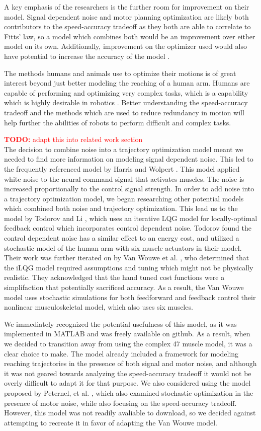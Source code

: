 \documentclass[letterpaper, 10pt, conference]{ieeeconf}
\newcommand{\todo}[1]{\textcolor{red}{\textbf{TODO:} #1}}
\begin{document}
A key emphasis of the researchers is the further room for improvement on their model. Signal dependent noise and motor planning optimization are likely both contributors to the speed-accuracy tradeoff as they both are able to correlate to Fitts’ law, so a model which combines both would be an improvement over either model on its own. Additionally, improvement on the optimizer used would also have potential to increase the accuracy of the model \cite{c4}.

The methods humans and animals use to optimize their motions is of great interest beyond just better modeling the reaching of a human arm. Humans are capable of performing and optimizing very complex tasks, which is a capability which is highly desirable in robotics \cite{c6}. Better understanding the speed-accuracy tradeoff and the methods which are used to reduce redundancy in motion will help further the abilities of robots to perform difficult and complex tasks.

\todo{adapt this into related work section} \\
The decision to combine noise into a trajectory optimization model meant we needed to find more information on modeling signal dependent noise. This led to the frequently referenced model by Harris and Wolpert \cite{c2}. This model applied white noise to the neural command signal that activates muscles. The noise is increased proportionally to the control signal strength. In order to add noise into a trajectory optimization model, we began researching other potential models which combined both noise and trajectory optimization. This lead us to the model by Todorov and Li \cite{c8}, which uses an iterative LQG model for locally-optimal feedback control which incorporates control dependent noise. Todorov found the control dependent noise has a similar effect to an energy cost, and utilized a stochastic model of the human arm with six muscle actuators in their model. Their work was further iterated on by Van Wouwe et al. \cite{c7}, who determined that the iLQG model required assumptions and tuning which might not be physically realistic. They acknowledged that the hand tuned cost functions were a simplifaction that potentially sacrificed accuracy. As a result, the Van Wouwe model uses stochastic simulations for both feedforward and feedback control their nonlinear musculoskeletal model, which also uses six muscles. 

We immediately recognized the potential usefulness of this model, as it was implemented in MATLAB and was freely available on github. As a result, when we decided to transition away from using the complex 47 muscle model, it was a clear choice to make. The model already included a framework for modeling reaching trajectories in the presence of both signal and motor noise, and although it was not geared towards analyzing the speed-accuracy tradeoff it would not be overly difficult to adapt it for that purpose. We also considered using the model proposed by Peternel, et al. \cite{c9}, which also examined stochastic optimization in the presence of motor noise, while also focusing on the speed-accuracy tradeoff. However, this model was not readily avaliable to download, so we decided against attempting to recreate it in favor of adapting the Van Wouwe model.
\end{document}

